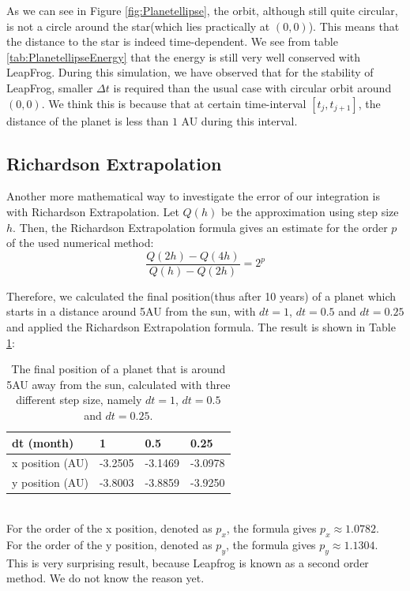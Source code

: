 As we can see in Figure \ref{fig:Planetellipse}, the orbit, although still quite circular, is not a circle around the star(which lies practically at $(0,0)$). This means that the distance to the star is indeed time-dependent. We see from table \ref{tab:PlanetellipseEnergy} that the energy is still very well conserved with LeapFrog. During this simulation, we have observed that for the stability of LeapFrog, smaller $\Delta t$ is required than the usual case with circular orbit around $(0,0)$. We think this is because that at certain time-interval $[t_j,t_{j+1}]$, the distance of the planet is less than $1$ AU during this interval. 
\subsection{Richardson Extrapolation}
Another more mathematical way to investigate the error of our integration is with Richardson Extrapolation. 
Let $Q(h)$ be the approximation using step size $h$. 
Then, the Richardson Extrapolation formula \cite{Richardson} gives an estimate for the order $p$ of the used numerical method:
\[\frac{Q(2h)-Q(4h)}{Q(h)-Q(2h)}=2^p\]

Therefore, we calculated the final position(thus after 10 years) of a planet which starts in a distance around 5AU from the sun, with $dt=1$, $dt=0.5$ and $dt=0.25$ and applied the Richardson Extrapolation formula. 
The result is shown in Table \ref{tab:Richardson5AU}:

\begin{table}[htb]
\centering
\caption{The final position of a planet that is around 5AU away from the sun, calculated with three different step size, namely $dt=1$, $dt=0.5$ and $dt=0.25$.}
\begin{tabular}{|l|l|l|l|}
\hline
dt (month)&1&0.5&0.25\\ \hline
x position (AU)&-3.2505&   -3.1469&   -3.0978\\ \hline
y position (AU)&   -3.8003&   -3.8859&   -3.9250\\ \hline
\end{tabular}
\label{tab:Richardson5AU}
\end{table}
\leavevmode
\\
For the order of the x position, denoted as $p_x$, the formula gives $p_x\approx 1.0782$.\\
For the order of the y position, denoted as $p_y$, the formula gives $p_y\approx 1.1304$.\\ 

This is very surprising result, because Leapfrog is known as a second order method. We do not know the reason yet.

